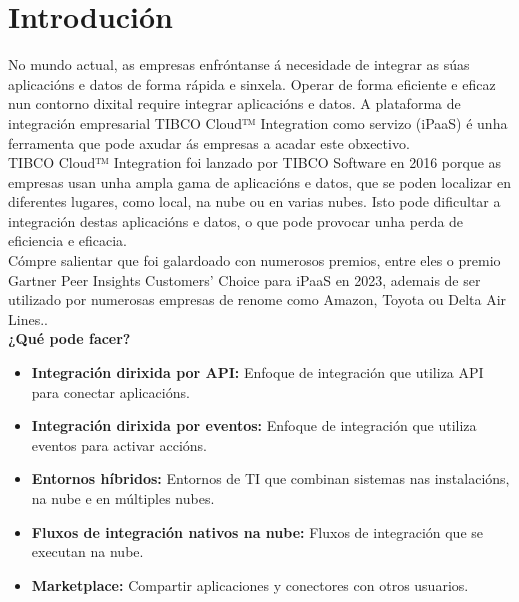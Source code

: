 \chapter{Introdución}
\label{chap:introduccion}
\begin{flushleft}
No mundo actual, as empresas enfróntanse á necesidade de integrar as súas aplicacións e datos de forma rápida e sinxela. Operar de forma eficiente e eficaz nun contorno dixital require integrar aplicacións e datos.
A plataforma de integración empresarial TIBCO Cloud™ Integration como servizo (iPaaS) é unha ferramenta que pode axudar ás empresas a acadar este obxectivo. \\
TIBCO Cloud™ Integration foi lanzado por TIBCO Software en 2016 porque as empresas usan unha ampla gama de aplicacións e datos, que se poden localizar en diferentes lugares, como local, na nube ou en varias nubes. Isto pode dificultar a integración destas aplicacións e datos, o que pode provocar unha perda de eficiencia e eficacia. \\
Cómpre salientar que foi galardoado con numerosos premios, entre eles o premio Gartner Peer Insights Customers' Choice para iPaaS en 2023, ademais de ser utilizado por numerosas empresas de renome como Amazon, Toyota ou Delta Air Lines.. \\
\textbf{¿Qué pode facer?}
\begin{itemize}
    \item \textbf{Integración dirixida por API: }Enfoque de integración que utiliza API para conectar aplicacións.
    \item \textbf{Integración dirixida por eventos: }Enfoque de integración que utiliza eventos para activar accións.
    \item \textbf{Entornos híbridos: }Entornos de TI que combinan sistemas nas instalacións, na nube e en múltiples nubes.
    \item \textbf{Fluxos de integración nativos na nube: }Fluxos de integración que se executan na nube.
    \item \textbf{Marketplace: }Compartir aplicaciones y conectores con otros usuarios.
\end{itemize}
\end{flushleft}

